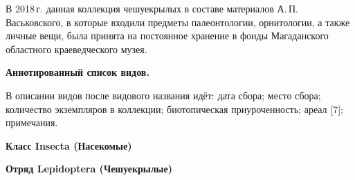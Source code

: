 В 2018\,г. данная коллекция чешуекрылых в составе материалов А.\,П.\,Вась\-ковского, в которые входили предметы палеонтологии, орнитологии, а также личные вещи, была принята на постоянное хранение в фонды Магаданского областного краеведческого музея.

\textbf{Аннотированный список видов.}

В описании видов после видового названия идёт: дата сбора; место сбора; количество экземпляров в коллекции; биотопическая приуроченность; ареал [7]; примечания.
\vspace{-6pt}
\begin{center}
\textbf{Класс Insecta (Насекомые)}

\textbf{Отряд Lepidoptera (Чешуекрылые)}
\end{center}

\vspace{-8pt}
